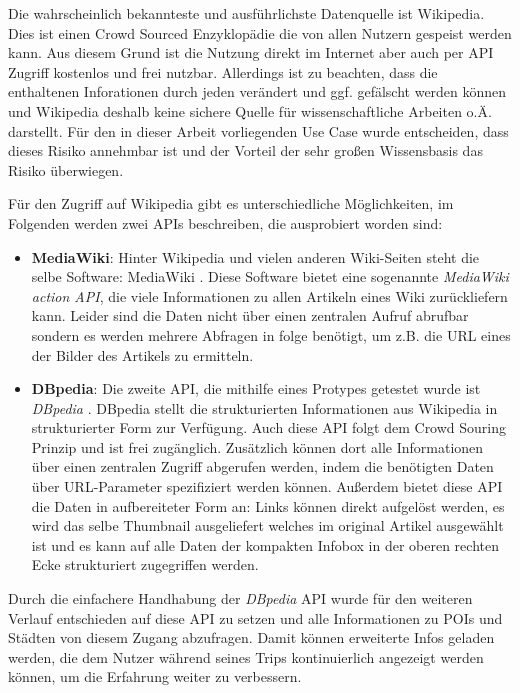 \vspace{0.25cm}

Die wahrscheinlich bekannteste und ausführlichste Datenquelle ist Wikipedia. Dies ist einen Crowd Sourced Enzyklopädie die von allen Nutzern gespeist werden kann. Aus diesem Grund ist die Nutzung direkt im Internet aber auch per API Zugriff kostenlos und frei nutzbar. Allerdings ist zu beachten, dass die enthaltenen Inforationen durch jeden verändert und ggf. gefälscht werden können und Wikipedia deshalb keine sichere Quelle für wissenschaftliche Arbeiten o.Ä. darstellt. Für den in dieser Arbeit vorliegenden Use Case wurde entscheiden, dass dieses Risiko annehmbar ist und der Vorteil der sehr großen Wissensbasis das Risiko überwiegen. 

\vspace{0.25cm}

Für den Zugriff auf Wikipedia gibt es unterschiedliche Möglichkeiten, im Folgenden werden zwei APIs beschreiben, die ausprobiert worden sind:

\begin{itemize}
	\item \textbf{MediaWiki}: Hinter Wikipedia und vielen anderen Wiki-Seiten steht die selbe Software: MediaWiki \cite{MediaWiki.24.01.2020}. Diese Software bietet eine sogenannte \textit{MediaWiki action API}, die viele Informationen zu allen Artikeln eines Wiki zurückliefern kann. Leider sind die Daten nicht über einen zentralen Aufruf abrufbar sondern es werden mehrere Abfragen in folge benötigt, um z.B. die URL eines der Bilder des Artikels zu ermitteln.
	
	\item \textbf{DBpedia}: Die zweite API, die mithilfe eines Protypes getestet wurde ist \textit{DBpedia} \cite{DBpedia.02.02.2020}. DBpedia stellt die strukturierten Informationen aus Wikipedia in strukturierter Form zur Verfügung. Auch diese API folgt dem Crowd Souring Prinzip und ist frei zugänglich. Zusätzlich können dort alle Informationen über einen zentralen Zugriff abgerufen werden, indem die benötigten Daten über URL-Parameter spezifiziert werden können. Außerdem bietet diese API die Daten in aufbereiteter Form an: Links können direkt aufgelöst werden, es wird das selbe Thumbnail ausgeliefert welches im original Artikel ausgewählt ist und es kann auf alle Daten der kompakten Infobox in der oberen rechten Ecke strukturiert zugegriffen werden.
\end{itemize}

Durch die einfachere Handhabung der \textit{DBpedia} API wurde für den weiteren Verlauf entschieden auf diese API zu setzen und alle Informationen zu POIs und Städten von diesem Zugang abzufragen. Damit können erweiterte Infos geladen werden, die dem Nutzer während seines Trips kontinuierlich angezeigt werden können, um die Erfahrung weiter zu verbessern.

